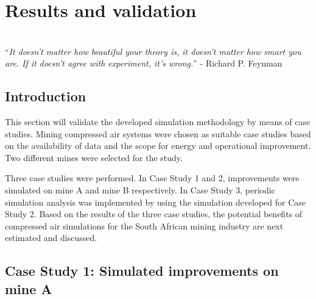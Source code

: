 \chapter{Results and validation}
\thispagestyle{empty}
\vspace{40em}
\hrulefill \\
\enquote{\textit{It doesn't matter how beautiful your theory is, it doesn't matter how smart you are. If it doesn't agree with experiment, it's wrong.}} - Richard P. Feynman\\
\newpage
\section{Introduction}
This section will validate the developed simulation methodology by means of case studies. Mining compressed air systems were chosen as suitable case studies based on the availability of data and the scope for energy and operational improvement. Two different mines were selected for the study. 
\par 
Three case studies were performed. In Case Study 1 and 2, improvements were simulated on mine A and mine B respectively. In Case Study 3, periodic simulation analysis was implemented by using the simulation developed for Case Study 2. Based on the results of the three case studies, the potential benefits of compressed air simulations for the South African mining industry are next estimated and discussed.

\section{Case Study 1: Simulated improvements on mine A}
